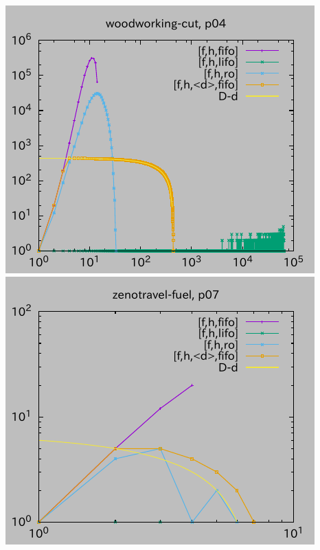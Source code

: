 \includegraphics{img/depth/woodworking-cut/p04.pdf}
\includegraphics{img/depth/zenotravel-fuel/p07.pdf}
